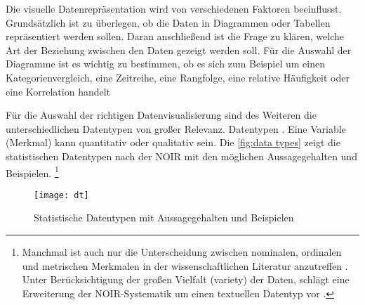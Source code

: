 
Die visuelle Datenrepräsentation wird von verschiedenen Faktoren beeinflusst.
Grundsätzlich ist zu überlegen, ob die Daten in Diagrammen oder Tabellen repräsentiert werden sollen.
Daran anschließend ist die Frage zu klären, welche Art der Beziehung zwischen den Daten gezeigt werden soll.
Für die Auswahl der Diagramme ist es wichtig zu bestimmen, ob es sich zum Beispiel um einen Kategorienvergleich, eine Zeitreihe, eine Rangfolge, 
eine relative Häufigkeit oder eine Korrelation handelt \cite[vgl.][137]{few_show_2012}

Für die Auswahl der richtigen Datenvisualisierung sind des Weiteren die unterschiedlichen Datentypen von großer Relevanz.
Datentypen  \cite[99]{kirk_data_2019}.  Eine Variable (Merkmal) kann quantitativ oder qualitativ sein.
Die \autoref{fig:data types} zeigt die statistischen Datentypen nach der \acrfull{NOIR} 
\cite[vgl.][12 ff.]{bortz_statistik_2010} mit den möglichen Aussagegehalten und Beispielen.
\footnote{Manchmal ist auch nur die Unterscheidung zwischen nominalen, ordinalen und metrischen
Merkmalen in der wissenschaftlichen Literatur anzutreffen \cite[vgl.][20]{cleff_deskriptive_2011}. 
Unter Berücksichtigung der großen Vielfalt (variety) der Daten, schlägt  
eine Erweiterung der \acrshort{NOIR}-Systematik um einen textuellen Datentyp vor \cite[vgl.][100]{kirk_data_2019}.}

 
 \begin{figure}[h]
    \centering
        \texttt{[image: dt]}
        \caption{Statistische Datentypen mit Aussagegehalten und Beispielen}
        \label{fig:data types}
\end{figure}


